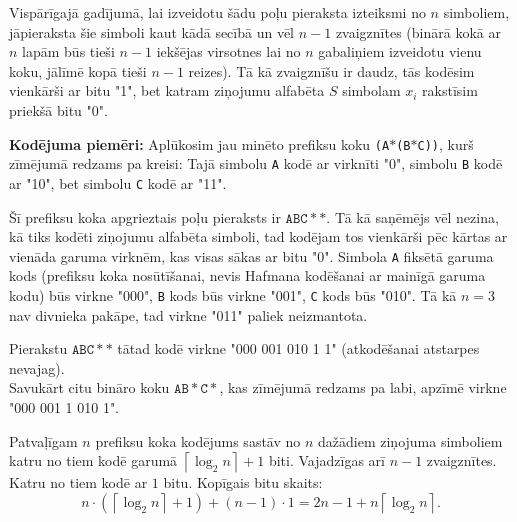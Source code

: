 \documentclass[a4paper,12pt]{article}
\begin{document}
{Vispārīgajā gadījumā, lai izveidotu šādu poļu pieraksta izteiksmi no $n$ simboliem, 
jāpieraksta šie simboli kaut kādā secībā un vēl $n-1$ zvaigznītes (binārā kokā 
ar $n$ lapām būs tieši $n-1$ iekšējas virsotnes \textendash{} lai no $n$ gabaliņiem izveidotu 
vienu koku, jālīmē kopā tieši $n-1$ reizes). 
Tā kā zvaigznīšu ir daudz, tās kodēsim vienkārši ar
bitu "1", bet katram ziņojumu alfabēta $S$ simbolam $x_i$ rakstīsim priekšā 
bitu "0".

{\bf Kodējuma piemēri:} Aplūkosim jau minēto
prefiksu koku {\tt (A$\ast$(B$\ast$C))}, kurš zīmējumā redzams pa kreisi: Tajā simbolu {\tt A} kodē ar 
virknīti "0", simbolu {\tt B} kodē ar "10", bet simbolu {\tt C} kodē ar "11".

Šī prefiksu koka apgrieztais poļu pieraksts ir $\mathtt{ABC}\ast\ast$. 
Tā kā saņēmējs vēl nezina, kā tiks kodēti ziņojumu alfabēta simboli,
tad kodējam tos vienkārši pēc kārtas ar vienāda garuma 
virknēm, kas visas sākas ar bitu "0". 
Simbola {\tt A} fiksētā garuma kods (prefiksu koka nosūtīšanai, 
nevis Hafmana kodēšanai ar mainīgā garuma kodu) būs 
virkne "000", {\tt B} kods būs virkne "001", 
{\tt C} kods būs "010". Tā kā $n=3$ nav divnieka pakāpe, tad virkne "011" paliek neizmantota. 

Pierakstu $\mathtt{ABC}\ast\ast$ tātad kodē virkne "000 001 010 1 1" (atkodēšanai atstarpes nevajag).\\
Savukārt citu bināro koku $\mathtt{AB}\ast\mathtt{C}\ast$, kas zīmējumā redzams pa labi, 
apzīmē virkne "000 001 1 010 1".

Patvaļīgam $n$ prefiksu koka kodējums sastāv no $n$ dažādiem ziņojuma simboliem \textendash{} katru 
no tiem kodē garumā $\left\lceil \log_2 n \right\rceil + 1$ biti. Vajadzīgas arī $n-1$ 
zvaigznītes. Katru no tiem kodē ar $1$ bitu. Kopīgais bitu skaits:
$$n\cdot\left( \left\lceil \log_2 n \right\rceil + 1 \right) + 
(n-1)\cdot{}1 = 2n-1 + n \left\lceil \log_2 n \right\rceil.$$


}
\end{document}
